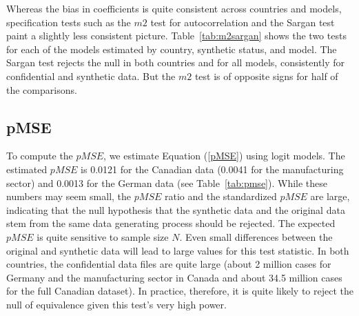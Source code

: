 


Whereas the bias in coefficients is quite consistent across countries and models, specification tests such as  the $m2$ test for autocorrelation and the Sargan test paint a slightly less consistent picture. Table~\ref{tab:m2sargan} shows the two tests for each of the models estimated by country, synthetic status, and model. The Sargan test rejects the null in both countries and for all models, consistently for confidential and synthetic data. But the $m2$ test is of opposite signs for half of the comparisons. 



%



\subsection{pMSE}


To compute the $pMSE$, we estimate Equation (\ref{pMSE}) using logit models. The estimated $pMSE$ is 0.0121 for the Canadian data (0.0041 for the manufacturing sector) and 0.0013 for the German data (see Table~\ref{tab:pmse}). While these numbers may seem small, the $pMSE$ ratio and the standardized $pMSE$ are large, indicating that the null hypothesis that the synthetic data and the original data stem from the same data generating process should be rejected. The expected $pMSE$ is quite sensitive to sample size $N$. Even small differences between the original and synthetic data will lead to large values for this test statistic. In both countries, the confidential data files are quite large (about 2 million cases for Germany and the manufacturing sector in Canada and about 34.5 million cases for the full Canadian dataset). In practice, therefore, it is quite likely to reject the null of equivalence  given this test's very high power. 


